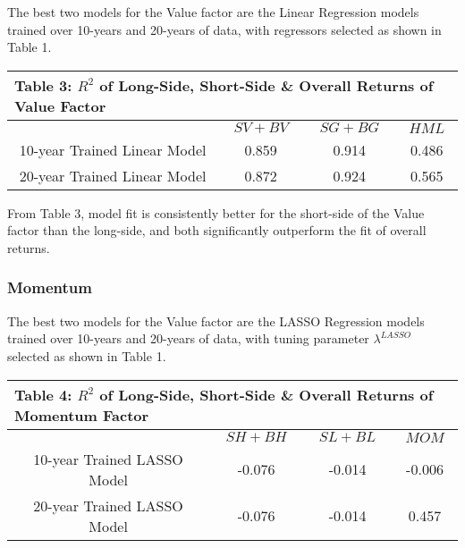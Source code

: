 \documentclass[AER]{AEA}
\begin{document}
\begin{spacing}{2}
The best two models for the Value factor are the Linear Regression models trained over 10-years and 20-years of data, with regressors selected as shown in Table 1.

\begin{spacing}{1}
\begin{table}[H]
    \centering
    \begin{tabular}{|c|c|c|c|}
    \multicolumn{4}{l}{\textbf{Table 3: \(R^2\) of Long-Side, Short-Side \& Overall Returns of Value Factor}}\\
    \hline
    & $SV+BV$ & $SG+BG$ & $HML$ \\
     \hline
    10-year Trained Linear Model & 0.859 & 0.914 & 0.486 \\
    \hline
    20-year Trained Linear Model & 0.872 & 0.924 & 0.565 \\
    \hline
    \end{tabular}
\end{table}
\end{spacing}

From Table 3, model fit is consistently better for the short-side of the Value factor than the long-side, and both significantly outperform the fit of overall returns.

\subsubsection{Momentum}

The best two models for the Value factor are the LASSO Regression models trained over 10-years and 20-years of data, with tuning parameter \(\lambda^{LASSO}\) selected as shown in Table 1.

\begin{spacing}{1}
\begin{table}[H]
    \centering
    \begin{tabular}{|c|c|c|c|}
    \multicolumn{4}{l}{\textbf{Table 4: \(R^2\) of Long-Side, Short-Side \& Overall Returns of Momentum Factor}}\\
    \hline
    & $SH+BH$ & $SL+BL$ & $MOM$ \\
     \hline
    10-year Trained LASSO Model & -0.076 & -0.014 & -0.006 \\
    \hline
    20-year Trained LASSO Model & -0.076 & -0.014 & 0.457 \\
    \hline
    \end{tabular}
\end{table}
\end{spacing}


\end{spacing}
\end{document}
